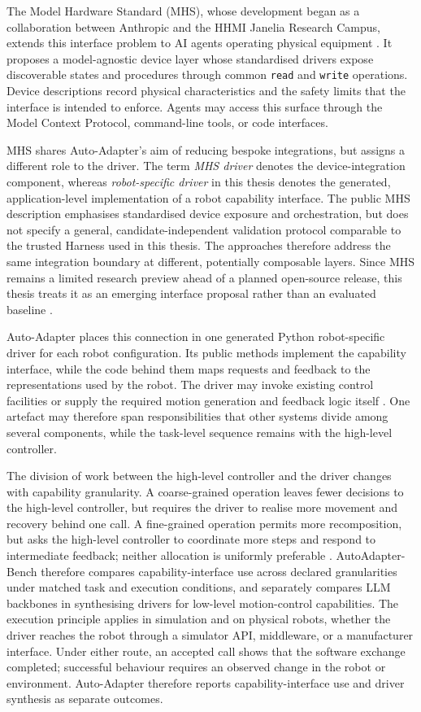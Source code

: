 The Model Hardware Standard (MHS), whose development began as a collaboration
between Anthropic and the HHMI Janelia Research Campus, extends this interface
problem to AI agents operating physical equipment \citep{anthropic2026mhs}. It
proposes a model-agnostic device layer whose standardised drivers expose
discoverable states and procedures through common \texttt{read} and
\texttt{write} operations. Device descriptions record physical characteristics
and the safety limits that the interface is intended to enforce. Agents may
access this surface through the Model Context Protocol, command-line tools, or
code interfaces.

MHS shares Auto-Adapter's aim of reducing bespoke integrations, but assigns a
different role to the driver. The term \emph{MHS driver} denotes the
device-integration component, whereas \emph{robot-specific driver} in this
thesis denotes the generated, application-level implementation of a robot
capability interface. The public MHS description emphasises standardised device
exposure and orchestration, but does not specify a general,
candidate-independent validation protocol comparable to the trusted Harness
used in this thesis. The approaches therefore address the same integration
boundary at different, potentially composable layers. Since MHS remains a
limited research preview ahead of a planned open-source release, this thesis
treats it as an emerging interface proposal rather than an evaluated baseline
\citep{anthropic2026mhs}.

Auto-Adapter places this connection in one generated Python robot-specific
driver for each robot configuration. Its public methods implement the
capability interface, while the code behind them maps requests and feedback to
the representations used by the robot. The driver may invoke existing control
facilities or supply the required motion generation and feedback logic itself
\citep{lynch2017modern}. One artefact may therefore span responsibilities that
other systems divide among several components, while the task-level sequence
remains with the high-level controller.

The division of work between the high-level controller and the driver changes
with capability granularity. A coarse-grained operation leaves fewer decisions
to the high-level controller, but requires the driver to realise more movement
and recovery behind one call. A fine-grained operation permits more
recomposition, but asks the high-level controller to coordinate more steps and
respond to intermediate feedback; neither allocation is uniformly preferable
\citep{zech2019action,pantano2022capabilitysurvey}. AutoAdapter-Bench therefore
compares capability-interface use across declared granularities under matched
task and execution conditions, and separately compares LLM backbones in
synthesising drivers for low-level motion-control capabilities. The execution
principle applies in simulation and on physical robots, whether the driver
reaches the robot through a simulator API, middleware, or a manufacturer
interface. Under either route, an accepted call shows that the software
exchange completed; successful behaviour requires an observed change in the
robot or environment. Auto-Adapter therefore reports capability-interface use
and driver synthesis as separate outcomes.

